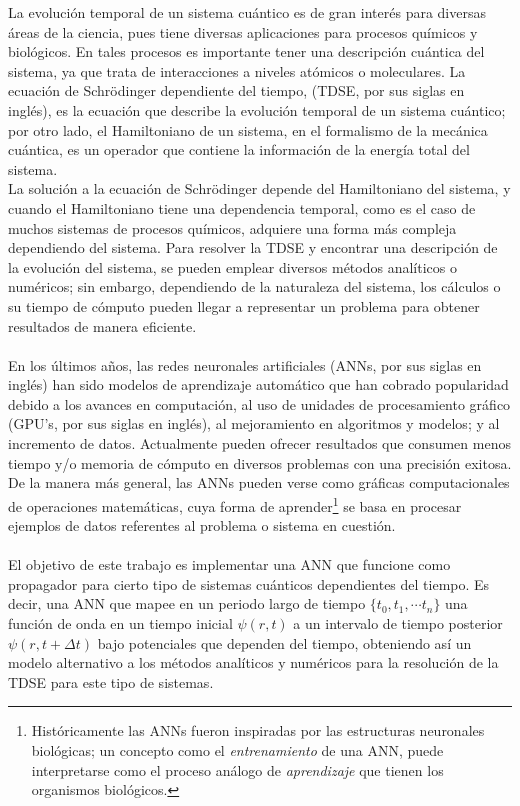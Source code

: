 La evolución temporal de un sistema cuántico es de gran interés para diversas áreas de la ciencia, pues tiene diversas aplicaciones para procesos químicos y biológicos. En tales procesos es importante tener una descripción cuántica del sistema, ya que trata de interacciones a niveles atómicos o moleculares. La ecuación de Schrödinger dependiente del tiempo, (\acs{TDSE}, por sus siglas en inglés), es la ecuación que describe la evolución temporal de un sistema cuántico; por otro lado, el Hamiltoniano de un sistema, en el formalismo de la mecánica cuántica, es un operador que contiene la información de la energía total del sistema.
\\
La solución a la ecuación de Schrödinger depende del Hamiltoniano del sistema, y cuando el Hamiltoniano tiene una dependencia temporal, como es el caso de muchos sistemas de procesos químicos, adquiere una forma más compleja dependiendo del sistema. Para resolver la \acs{TDSE} y encontrar una descripción de la evolución del sistema, se pueden emplear diversos métodos analíticos o numéricos; sin embargo, dependiendo de la naturaleza del sistema, los cálculos o su tiempo de cómputo pueden llegar a representar un problema para obtener resultados de manera eficiente.
\\
\\
En los últimos años, las redes neuronales artificiales (\acs{ANN}s, por sus siglas en inglés) han sido modelos de aprendizaje automático que han cobrado popularidad debido a los avances en computación, al uso de unidades de procesamiento gráfico (GPU's, por sus siglas en inglés), al mejoramiento en algoritmos y modelos; y al incremento de datos. Actualmente pueden ofrecer resultados que consumen menos tiempo y/o memoria de cómputo en diversos problemas con una precisión exitosa. De la manera más general, las \acs{ANN}s pueden verse como gráficas computacionales de operaciones matemáticas, cuya forma de aprender\footnote{Históricamente las \acs{ANN}s fueron inspiradas por las estructuras neuronales biológicas; un concepto como el \emph{entrenamiento} de una \acs{ANN}, puede interpretarse como el proceso análogo de \emph{aprendizaje} que tienen los organismos biológicos.} se basa en procesar ejemplos de datos referentes al problema o sistema en cuestión.
\\
\\
El objetivo de este trabajo es implementar una \acs{ANN} que funcione como propagador para cierto tipo de sistemas cuánticos dependientes del tiempo. Es decir, una \acs{ANN} que mapee en un periodo largo de tiempo $\{t_0,t_1,\cdots t_n\}$ una función de onda en un tiempo inicial $\psi(r,t)$ a un intervalo de tiempo posterior $\psi(r,t+\Delta t)$ bajo potenciales que dependen del tiempo, obteniendo así un modelo alternativo a los métodos analíticos y numéricos para la resolución de la \acs{TDSE} para este tipo de sistemas.

